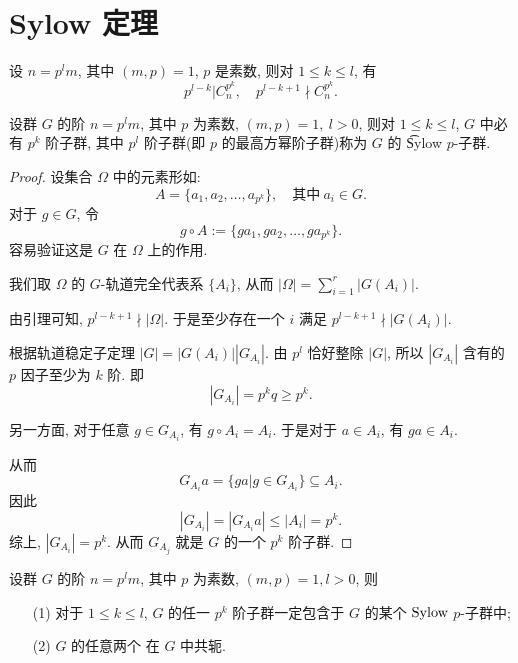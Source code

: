 \section{Sylow 定理}


\begin{lemma}
	设 $n=p^lm$, 其中 $(m,p)=1$, $p$ 是素数, 则对 $1\leqslant k\leqslant l$, 有 $$p^{l-k}|C_n^{p^k},\quad p^{l-k+1}\nmid C_n^{p^k}.$$
\end{lemma}

\begin{theorem}\label{Sylow1}
	设群 $G$ 的阶 $n=p^lm$, 其中 $p$ 为素数, $(m,p)=1,\ l>0$, 则对 $1\leqslant k\leqslant l$, $G$ 中必有 $p^k$ 阶子群, 其中 $p^l$ 阶子群(即 $p$ 的最高方幂阶子群)称为 $G$ 的 \t{Sylow} $p$-子群.
\end{theorem}


\begin{proof}
	设集合 $\Omega$ 中的元素形如: $$A=\{a_1,a_2,\ldots,a_{p^k}\},\quad \text{其中}\ a_i\in G.$$
	对于 $g\in G$, 令 $$g\circ A:=\{ga_1,ga_2,\ldots,ga_{p^k}\}.$$
	容易验证这是 $G$ 在 $\Omega$ 上的作用.

	我们取 $\Omega$ 的 $G$-轨道完全代表系 $\{A_i\}$, 从而 $|\Omega| = \sum\limits_{i=1}^r |G(A_i)|$.

	由引理可知, $p^{l-k+1} \nmid |\Omega|$. 于是至少存在一个 $i$ 满足 $p^{l-k+1}\nmid |G(A_i)|$.

	根据轨道稳定子定理 $|G| = |G(A_i)||G_{A_i}|$. 由 $p^l$ 恰好整除 $|G|$, 所以 $|G_{A_i}|$ 含有的 $p$ 因子至少为 $k$ 阶. 即 $$|G_{A_i}|=p^kq\geqslant p^k.$$

	另一方面, 对于任意 $g\in G_{A_i}$, 有 $g\circ A_i = A_i$. 于是对于 $a\in A_i$, 有 $ga \in A_i$.

	从而 $$G_{A_i}a=\{ga|g\in G_{A_i}\}\subseteq A_i.$$
	因此 $$|G_{A_i}| = |G_{A_i}a|\leqslant|A_i| = p^k.$$
	综上, $|G_{A_i}| = p^k$. 从而 $G_{A_j}$ 就是 $G$ 的一个 $p^k$ 阶子群.
\end{proof}

\begin{theorem}\label{Sylow2}
	设群 $G$ 的阶 $n=p^lm$, 其中 $p$ 为素数, $(m,p)=1,l>0$, 则
	\begin{itemize}
		\item[(1)] 对于 $1\leqslant k \leqslant l$, $G$ 的任一 $p^k$ 阶子群一定包含于 $G$ 的某个 $\text {Sylow}$ $p$-子群中;
		\item[(2)] $G$ 的任意两个 \Sy 在 $G$ 中共轭.
	\end{itemize}
\end{theorem}

